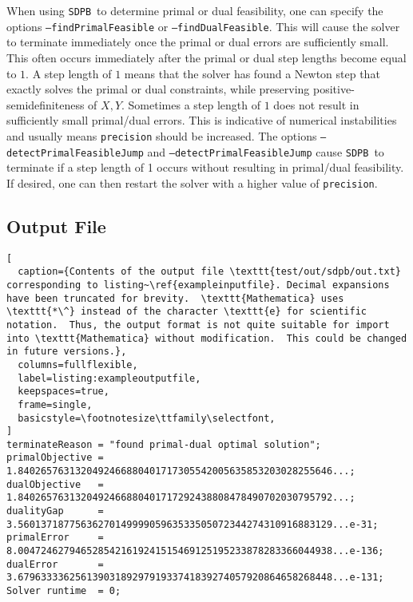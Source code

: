 \documentclass[12pt]{article}
\numberwithin{equation}{section}
\newcommand\SDPB{\texttt{SDPB}}
\begin{document}
When using \SDPB\ to determine primal or dual feasibility, one can specify the options \texttt{--findPrimalFeasible} or \texttt{--findDualFeasible}.  This will cause the solver to terminate immediately once the primal or dual errors are sufficiently small.  This often occurs immediately after the primal or dual step lengths become equal to $1$.  A step length of $1$ means that the solver has found a Newton step that exactly solves the primal or dual constraints, while preserving positive-semidefiniteness of $X,Y$.  Sometimes a step length of $1$ does not result in sufficiently small primal/dual errors.  This is indicative of numerical instabilities and usually means \texttt{precision} should be increased.  The options \texttt{--detectPrimalFeasibleJump} and \texttt{--detectPrimalFeasibleJump} cause \SDPB\ to terminate if a step length of 1 occurs without resulting in primal/dual feasibility.  If desired, one can then restart the solver with a higher value of \texttt{precision}.


\subsection{Output File}

\begin{lstlisting}[
  caption={Contents of the output file \texttt{test/out/sdpb/out.txt} corresponding to listing~\ref{exampleinputfile}. Decimal expansions have been truncated for brevity.  \texttt{Mathematica} uses \texttt{*\^} instead of the character \texttt{e} for scientific notation.  Thus, the output format is not quite suitable for import into \texttt{Mathematica} without modification.  This could be changed in future versions.},
  columns=fullflexible,
  label=listing:exampleoutputfile,
  keepspaces=true,
  frame=single,
  basicstyle=\footnotesize\ttfamily\selectfont,
]
terminateReason = "found primal-dual optimal solution";
primalObjective = 1.8402657631320492466880401717305542005635853203028255646...;
dualObjective   = 1.8402657631320492466880401717292438808478490702030795792...;
dualityGap      = 3.5601371877563627014999905963533505072344274310916883129...e-31;
primalError     = 8.0047246279465285421619241515469125195233878283366044938...e-136;
dualError       = 3.6796333362561390318929791933741839274057920864658268448...e-131;
Solver runtime  = 0;
\end{lstlisting}
\end{document}
